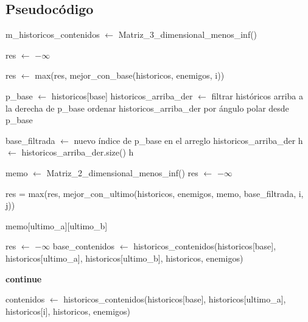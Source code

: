\subsection{Pseudocódigo}
\begin{algorithmic}
	\State m_historicos_contenidos $\gets$ Matriz_3_dimensional_menos_inf() 

	\State res $\gets$ $-\infty$

		\State res $\gets$ max(res, mejor_con_base(historicos, enemigos, i))
	\EndFor

\EndFunction

\vspace{2em}
	\State p_base $\gets$ historicos[base]
	\State historicos_arriba_der $\gets$ filtrar históricos arriba a la derecha de p_base
	\State ordenar historicos_arriba_der por ángulo polar desde p_base

	\State base_filtrada $\gets$ nuevo índice de p_base en el arreglo historicos_arriba_der
	\State h $\gets$ historicos_arriba_der.size()
		\State \Return h
	\EndIf

	\State memo $\gets$ Matriz_2_dimensional_menos_inf() 
	\State res $\gets$ $-\infty$

			 
				\State res = max(res, mejor_con_ultimo(historicos, enemigos, memo, base_filtrada, i, j))
			\EndIf
		\EndFor
	\EndFor
\EndFunction
\vspace{2em}

		\State \Return memo[ultimo_a][ultimo_b]
	\EndIf

	\State res $\gets$ $-\infty$
	\State {} 
	\State base_contenidos $\gets$ historicos_contenidos(historicos[base], historicos[ultimo_a], historicos[ultimo_b], historicos, enemigos) 

				\State \textbf{continue}
			\EndIf

			\State contenidos $\gets$ historicos_contenidos(historicos[base], historicos[ultimo_a], historicos[i], historicos, enemigos)


\end{algorithmic}
